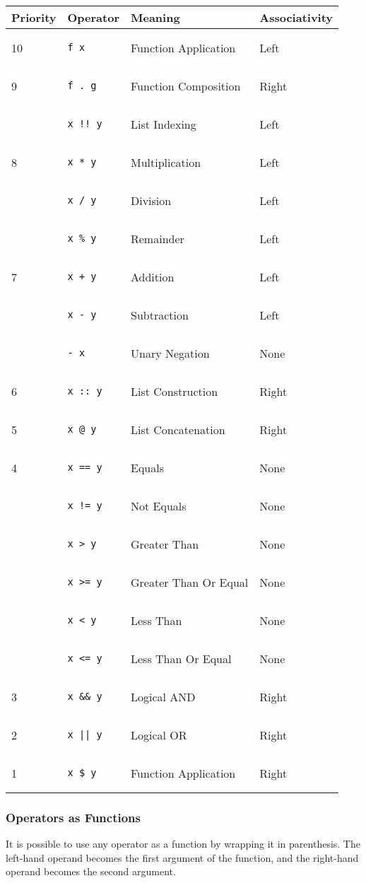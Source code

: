 \documentclass{article}
\def\code#1{\begin{footnotesize}\texttt{#1}\end{footnotesize}}
\begin{document}
\begin{tabular}{|l|l|l|l|}
  \hline
  \textbf{Priority} & \textbf{Operator} & \textbf{Meaning} & \textbf{Associativity}\\
  \hline
  10 & \code{f x} & Function Application & Left\\
  \hline
  9 & \code{f . g} & Function Composition & Right\\
  \hline
   & \code{x !! y} & List Indexing & Left\\
  \hline
  8 & \code{x * y} & Multiplication & Left\\
  \hline
   & \code{x / y} & Division & Left\\
  \hline
   & \code{x \% y} & Remainder & Left\\
  \hline
  7 & \code{x + y} & Addition & Left\\
  \hline
   & \code{x - y} & Subtraction & Left\\
  \hline
   & \code{- x} & Unary Negation & None\\
  \hline
  6 & \code{x :: y} & List Construction & Right\\
  \hline
  5 & \code{x @ y} & List Concatenation & Right\\
  \hline
  4 & \code{x == y} & Equals & None\\
  \hline
   & \code{x != y} & Not Equals & None\\
  \hline
   & \code{x > y} & Greater Than & None\\
  \hline
   & \code{x >= y} & Greater Than Or Equal & None\\
  \hline
   & \code{x < y} & Less Than & None\\
  \hline
   & \code{x <= y} & Less Than Or Equal & None\\
  \hline
  3 & \code{x \&\& y} & Logical AND & Right\\
  \hline
  2 & \code{x || y} & Logical OR & Right\\
  \hline
  1 & \code{x \$ y} & Function Application & Right\\
  \hline
\end{tabular}

\subsubsection{Operators as Functions}

It is possible to use any operator as a function by wrapping it in parenthesis.
The left-hand operand becomes the first argument of the function, and the right-hand operand becomes the second argument.
\end{document}

